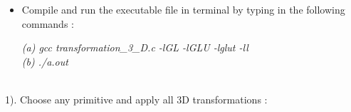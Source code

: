 \begin{itemize}
\begin{lstlisting}
        if(choice==5)
        {
                printf("\nEnter the rotation_angle :  ");
                scanf("%lf",&rotation_angle_x);
                rotate(rotation_angle_x);
        }
}


int main(int argc, char const *argv[])
{
	glutInit(&argc, argv);
    	glutInitDisplayMode(GLUT_RGB);
    	glutInitWindowSize(800, 800);
    	glutInitWindowSize(800, 800);
    	transformPoints();
    	matrix_multiplication();
    	glClearColor(1.0, 1.0, 1.0, 1.0);
    	gluOrtho2D(-400, 400, -400, 400);
        glutCreateWindow("\nPolygon transformations");
        glutDisplayFunc(displayPolygon);
        glutMainLoop();
	return 0;
}

\end{lstlisting}

\vspace{0.5mm}

\item Compile and run the executable file in terminal by typing in the following commands : \\

\vspace{0.5mm} \flushleft

\textit{(a)\hspace{2mm} gcc transformation\_3\_D.c -lGL -lGLU -lglut -ll} \\
\textit{(b)\hspace{2mm} ./a.out}
\vspace*{1\baselineskip}
\end{itemize}

\\

1). Choose any primitive  and  apply all 3D transformations  :

